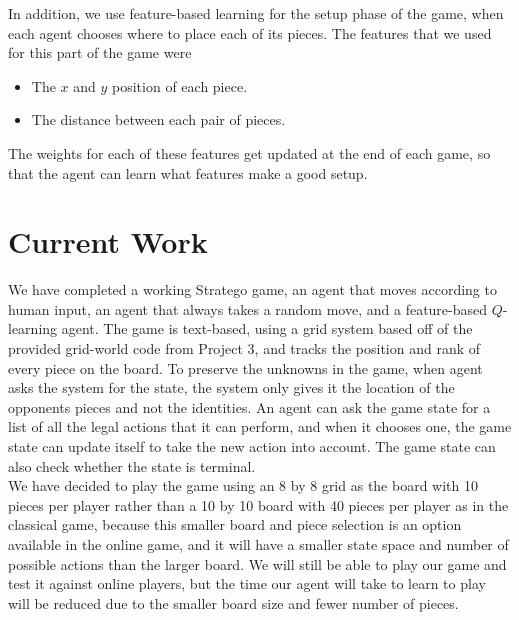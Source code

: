 \documentclass[letterpaper]{article}
\begin{document}
In addition, we use feature-based learning for the setup phase of the game, when each agent chooses where to place each of its pieces. The features that we used for this part of the game were
\begin{itemize}
\item The $x$ and $y$ position of each piece.
\item The distance between each pair of pieces.
\end{itemize}

The weights for each of these features get updated at the end of each game, so that the agent can learn what features make a good setup.


\section{Current Work}

We have completed a working Stratego game, an agent that moves according to human input, an agent that always takes a random move, and a feature-based $Q$-learning agent. The game is text-based, using a grid system based off of the provided grid-world code from Project 3, and tracks the position and rank of every piece on the board. To preserve the unknowns in the game, when agent asks the system for the state, the system only gives it the location of the opponents pieces and not the identities. An agent can ask the game state for a list of all the legal actions that it can perform, and when it chooses one, the game state can update itself to take the new action into account. The game state can also check whether the state is terminal.\\

We have decided to play the game using an 8 by 8 grid as the board with 10 pieces per player rather than a 10 by 10 board with 40 pieces per player as in the classical game, because this smaller board and piece selection is an option available in the online game, and it will have a smaller state space and number of possible actions than the larger board. We will still be able to play our game and test it against online players, but the time our agent will take to learn to play will be reduced due to the smaller board size and fewer number of pieces.\\
\end{document}
